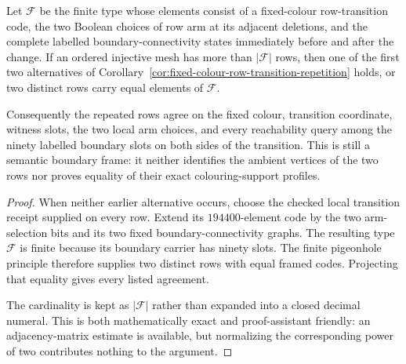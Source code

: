 \begin{corollary}
\label{cor:fixed-colour-row-transition-frame-repetition}
Let $\mathcal F$ be the finite type whose elements consist of a fixed-colour
row-transition code, the two Boolean choices of row arm at its adjacent
deletions, and the complete labelled boundary-connectivity states immediately
before and after the change.  If an ordered injective mesh has more than
$|\mathcal F|$ rows, then one of the first two alternatives of
Corollary~\ref{cor:fixed-colour-row-transition-repetition} holds, or two
distinct rows carry equal elements of $\mathcal F$.

Consequently the repeated rows agree on the fixed colour, transition
coordinate, witness slots, the two local arm choices, and every reachability
query among the ninety labelled boundary slots on both sides of the
transition.  This is still a semantic boundary frame: it neither identifies
the ambient vertices of the two rows nor proves equality of their exact
colouring-support profiles.
\end{corollary}

\begin{proof}
When neither earlier alternative occurs, choose the checked local transition
receipt supplied on every row.  Extend its $194400$-element code by the two
arm-selection bits and its two fixed boundary-connectivity graphs.  The
resulting type $\mathcal F$ is finite because its boundary carrier has ninety
slots.  The finite pigeonhole principle therefore supplies two distinct rows
with equal framed codes.  Projecting that equality gives every listed
agreement.

The cardinality is kept as $|\mathcal F|$ rather than expanded into a closed
decimal numeral.  This is both mathematically exact and proof-assistant
friendly: an adjacency-matrix estimate is available, but normalizing the
corresponding power of two contributes nothing to the argument.
\end{proof}

